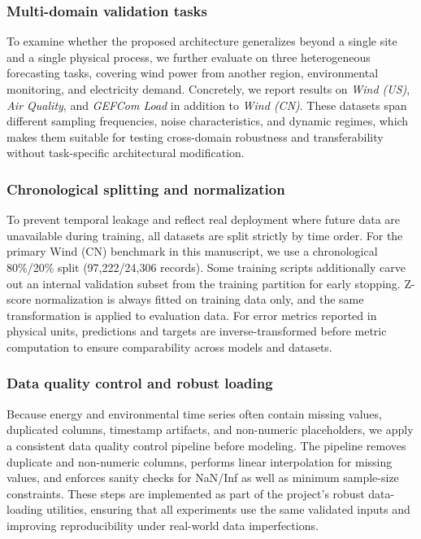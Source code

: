 \documentclass[review,3p,times]{elsarticle}
\begin{document}
\subsubsection{Multi-domain validation tasks}
To examine whether the proposed architecture generalizes beyond a single site and a single physical process, we further evaluate on three heterogeneous forecasting tasks, covering wind power from another region, environmental monitoring, and electricity demand. Concretely, we report results on \emph{Wind (US)}, \emph{Air Quality}, and \emph{GEFCom Load} in addition to \emph{Wind (CN)}. These datasets span different sampling frequencies, noise characteristics, and dynamic regimes, which makes them suitable for testing cross-domain robustness and transferability without task-specific architectural modification.

\subsubsection{Chronological splitting and normalization}
To prevent temporal leakage and reflect real deployment where future data are unavailable during training, all datasets are split strictly by time order. For the primary Wind (CN) benchmark in this manuscript, we use a chronological 80\%/20\% split (97,222/24,306 records). Some training scripts additionally carve out an internal validation subset from the training partition for early stopping. Z-score normalization is always fitted on training data only, and the same transformation is applied to evaluation data. For error metrics reported in physical units, predictions and targets are inverse-transformed before metric computation to ensure comparability across models and datasets.

\subsubsection{Data quality control and robust loading}
Because energy and environmental time series often contain missing values, duplicated columns, timestamp artifacts, and non-numeric placeholders, we apply a consistent data quality control pipeline before modeling. The pipeline removes duplicate and non-numeric columns, performs linear interpolation for missing values, and enforces sanity checks for NaN/Inf as well as minimum sample-size constraints. These steps are implemented as part of the project's robust data-loading utilities, ensuring that all experiments use the same validated inputs and improving reproducibility under real-world data imperfections.
\end{document}
